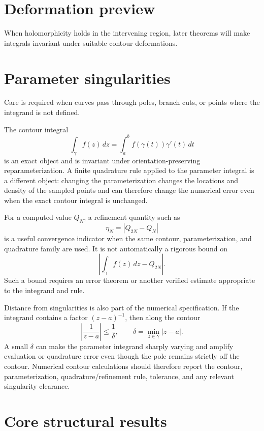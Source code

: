 \section{Deformation preview}
When holomorphicity holds in the intervening region, later theorems will make integrals invariant under suitable contour deformations.

\section{Parameter singularities}
Care is required when curves pass through poles, branch cuts, or points where the integrand is not defined.

\begin{remark}
The contour integral
\[
\int_\gamma f(z)\,dz
=
\int_a^b f(\gamma(t))\gamma'(t)\,dt
\]
is an exact object and is invariant under orientation-preserving
reparameterization.  A finite quadrature rule applied to the parameter
integral is a different object: changing the parameterization changes the
locations and density of the sampled points and can therefore change the
numerical error even when the exact contour integral is unchanged.

For a computed value \(Q_N\), a refinement quantity such as
\[
\eta_N=|Q_{2N}-Q_N|
\]
is a useful convergence indicator when the same contour, parameterization, and
quadrature family are used.  It is not automatically a rigorous bound on
\[
\left|\int_\gamma f(z)\,dz-Q_{2N}\right|.
\]
Such a bound requires an error theorem or another verified estimate appropriate
to the integrand and rule.

Distance from singularities is also part of the numerical specification.  If
the integrand contains a factor \((z-a)^{-1}\), then along the contour
\[
\left|\frac{1}{z-a}\right|
\le
\frac{1}{\delta},
\qquad
\delta=\min_{z\in\gamma}|z-a|.
\]
A small \(\delta\) can make the parameter integrand sharply varying and amplify
evaluation or quadrature error even though the pole remains strictly off the
contour.  Numerical contour calculations should therefore report the contour,
parameterization, quadrature/refinement rule, tolerance, and any relevant
singularity clearance.
\end{remark}

\section{Core structural results}

